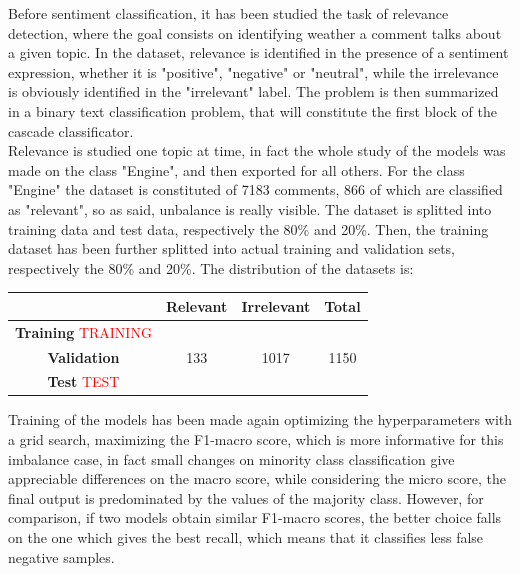 Before sentiment classification, it has been studied the task of relevance detection, where the goal consists on identifying weather a comment talks about a given topic. In the dataset, relevance is identified in the presence of a sentiment expression, whether it is "positive", "negative" or "neutral", while the irrelevance is obviously identified in the "irrelevant" label. The problem is then summarized in a binary text classification problem, that will constitute the first block of the cascade classificator.\\
Relevance is studied one topic at time, in fact the whole study of the models was made on the class "Engine", and then exported for all others. For the class "Engine" the dataset is constituted of 7183 comments, 866 of which are classified as "relevant", so as said, unbalance is really visible. The dataset is splitted into training data and test data, respectively the 80\% and 20\%. Then, the training dataset has been further splitted into actual training and validation sets, respectively the 80\% and 20\%. The distribution of the datasets is:

\begin{center}
	\begin{tabular}{ | c  c  c | c | } 
		\hline
		& \textbf{Relevant} & \textbf{Irrelevant} & \textbf{Total} \\
		\hline
		
		\textbf{Training} \textcolor{red}{TRAINING} &  &  &  \\ 
		\hline
		\textbf{Validation} & 133 & 1017 & 1150 \\ 
		\hline
		\textbf{Test} \textcolor{red}{TEST} &  &  & \\
		\hline
	\end{tabular}
\end{center}

Training of the models has been made again optimizing the hyperparameters with a grid search, maximizing the F1-macro score, which is more informative for this imbalance case, in fact small changes on minority class classification give appreciable differences on the macro score, while considering the micro score, the final output is predominated by the values of the majority class. However, for comparison, if two models obtain similar F1-macro scores, the better choice falls on the one which gives the best recall, which means that it classifies less false negative samples.



